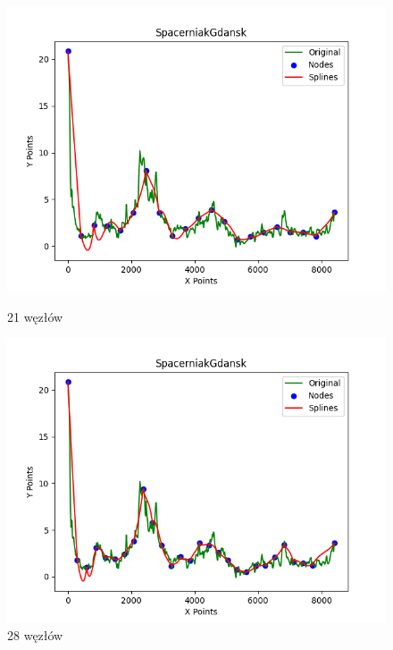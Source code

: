\documentclass{article}
\begin{document}
\begin{figure}[H]
    \centering
    \begin{minipage}[b]{0.49\textwidth}
        \centering
        \includegraphics[width=\textwidth]{plots/SpacerniakGdansk_splines_21.png}
        \caption{21 węzłów}
        \label{fig:21nodes}
    \end{minipage}
    \hfill
    \begin{minipage}[b]{0.49\textwidth}
        \centering
        \includegraphics[width=\textwidth]{plots/SpacerniakGdansk_splines_28.png}
        \caption{28 węzłów}
        \label{fig:28nodes}
    \end{minipage}
\end{figure}
\end{document}
